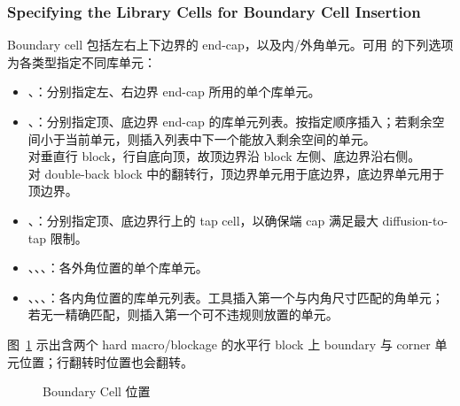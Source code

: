 \subsubsection*{Specifying the Library Cells for Boundary Cell Insertion}

Boundary cell 包括左右上下边界的 end-cap，以及内/外角单元。可用  的下列选项为各类型指定不同库单元：
\begin{itemize}
  \item {}、：分别指定左、右边界 end-cap 所用的单个库单元。
  \item {}、：分别指定顶、底边界 end-cap 的库单元列表。按指定顺序插入；若剩余空间小于当前单元，则插入列表中下一个能放入剩余空间的单元。\\
        对垂直行 block，行自底向顶，故顶边界沿 block 左侧、底边界沿右侧。\\
        对 double-back block 中的翻转行，顶边界单元用于底边界，底边界单元用于顶边界。
  \item {}、：分别指定顶、底边界行上的 tap cell，以确保端 cap 满足最大 diffusion-to-tap 限制。
  \item {}、、、：各外角位置的单个库单元。
  \item {}、、、：各内角位置的库单元列表。工具插入第一个与内角尺寸匹配的角单元；若无一精确匹配，则插入第一个可不违规则放置的单元。
\end{itemize}

图~\ref{fig:boundary-cell-locations} 示出含两个 hard macro/blockage 的水平行 block 上 boundary 与 corner 单元位置；行翻转时位置也会翻转。

\begin{figure}[htbp]
\centering
{}
\caption{Boundary Cell 位置}
\label{fig:boundary-cell-locations}
\end{figure}

